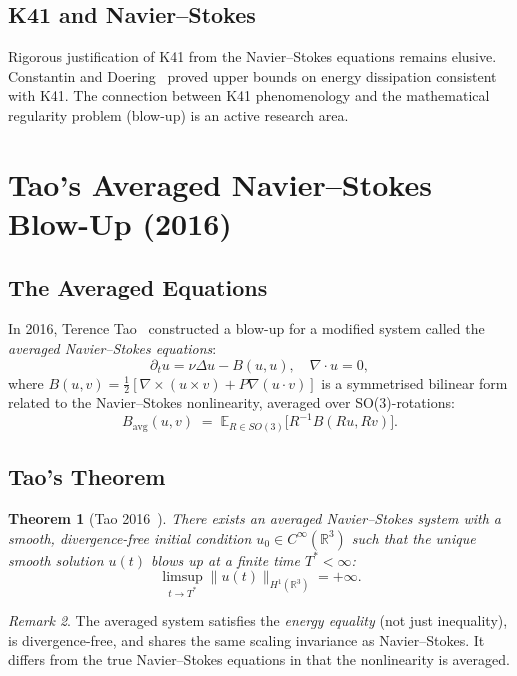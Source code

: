 \documentclass[12pt,a4paper]{article}
\newtheorem{theorem}{Theorem}[section]
\theoremstyle{remark}
\newtheorem{remark}[theorem]{Remark}
\begin{document}
\subsection{K41 and Navier--Stokes}

Rigorous justification of K41 from the Navier--Stokes equations remains elusive.
Constantin and Doering~\cite{ConstantinDoering1994} proved upper bounds on energy
dissipation consistent with K41.  The connection between K41 phenomenology and the
mathematical regularity problem (blow-up) is an active research area.

\section{Tao's Averaged Navier--Stokes Blow-Up (2016)}

\subsection{The Averaged Equations}

In 2016, Terence Tao~\cite{Tao2016} constructed a blow-up for a modified system called
the \emph{averaged Navier--Stokes equations}:
\[
  \partial_t u = \nu\Delta u - B(u,u), \quad \nabla\cdot u = 0,
\]
where $B(u,v) = \frac{1}{2}[\nabla\times(u\times v) + P\nabla(u\cdot v)]$ is a
symmetrised bilinear form related to the Navier--Stokes nonlinearity, averaged over
SO(3)-rotations:
\[
  B_{\mathrm{avg}}(u,v) \;=\; \mathbb{E}_{R \in SO(3)}\bigl[R^{-1}B(Ru, Rv)\bigr].
\]

\subsection{Tao's Theorem}

\begin{theorem}[Tao 2016~\cite{Tao2016}]
  There exists an averaged Navier--Stokes system with a smooth, divergence-free initial
  condition $u_0 \in C^\infty(\mathbb{R}^3)$ such that the unique smooth solution
  $u(t)$ blows up at a finite time $T^* < \infty$:
  \[
    \limsup_{t \to T^*} \|u(t)\|_{H^1(\mathbb{R}^3)} = +\infty.
  \]
\end{theorem}

\begin{remark}
  The averaged system satisfies the \emph{energy equality} (not just inequality),
  is divergence-free, and shares the same scaling invariance as Navier--Stokes.
  It differs from the true Navier--Stokes equations in that the nonlinearity is averaged.
\end{remark}
\end{document}
